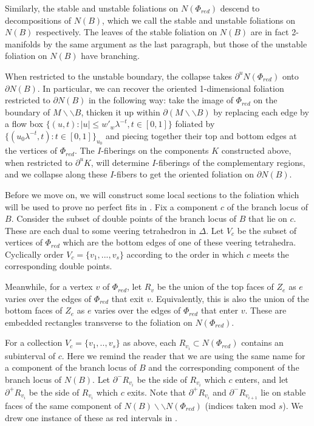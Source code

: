 \documentclass[12pt]{amsart}
\theoremstyle{definition}
\numberwithin{equation}{section}
\begin{document}
Similarly, the stable and unstable foliations on $N(\Phi_{red})$ descend to decompositions of $N(B)$, which we call the stable and unstable foliations on $N(B)$ respectively. The leaves of the stable foliation on $N(B)$ are in fact 2-manifolds by the same argument as the last paragraph, but those of the unstable foliation on $N(B)$ have branching. 

When restricted to the unstable boundary, the collapse takes $\partial^u N(\Phi_{red})$ onto $\partial N(B)$. In particular, we can recover the oriented 1-dimensional foliation restricted to $\partial N(B)$ in the following way: take the image of $\Phi_{red}$ on the boundary of $M \backslash \backslash B$, thicken it up within $\partial (M \backslash \backslash B)$ by replacing each edge by a flow box $\{ (u,t): |u| \leq w'_w \lambda^{-t}, t \in [0,1]\}$ foliated by $\{(u_0 \lambda^{-t}, t): t \in [0,1] \}_{u_0}$ and piecing together their top and bottom edges at the vertices of $\Phi_{red}$. The $I$-fiberings on the components $K$ constructed above, when restricted to $\partial^u K$, will determine $I$-fiberings of the complementary regions, and we collapse along these $I$-fibers to get the oriented foliation on $\partial N(B)$.

Before we move on, we will construct some local sections to the foliation which will be used to prove no perfect fits in . Fix a component $c$ of the branch locus of $B$. Consider the subset of double points of the branch locus of $B$ that lie on $c$. These are each dual to some veering tetrahedron in $\Delta$. Let $V_c$ be the subset of vertices of $\Phi_{red}$ which are the bottom edges of one of these veering tetrahedra. Cyclically order $V_c=\{v_1,...,v_s\}$ according to the order in which $c$ meets the corresponding double points. 

Meanwhile, for a vertex $v$ of $\Phi_{red}$, let $R_v$ be the union of the top faces of $Z_e$ as $e$ varies over the edges of $\Phi_{red}$ that exit $v$. Equivalently, this is also the union of the bottom faces of $Z_e$ as $e$ varies over the edges of $\Phi_{red}$ that enter $v$. These are embedded rectangles transverse to the foliation on $N(\Phi_{red})$.

For a collection $V_c=\{v_1,..,v_s\}$ as above, each $R_{v_i} \subset N(\Phi_{red})$ contains an subinterval of $c$. Here we remind the reader that we are using the same name for a component of the branch locus of $B$ and the corresponding component of the branch locus of $N(B)$. Let $\partial^- R_{v_i}$ be the side of $R_{v_i}$ which $c$ enters, and let $\partial^+ R_{v_i}$ be the side of $R_{v_i}$ which $c$ exits. Note that $\partial^+ R_{v_i}$ and $\partial^- R_{v_{i+1}}$ lie on stable faces of the same component of $N(B) \backslash \backslash N(\Phi_{red})$ (indices taken mod $s$). We drew one instance of these as red intervals in .
\end{document}
